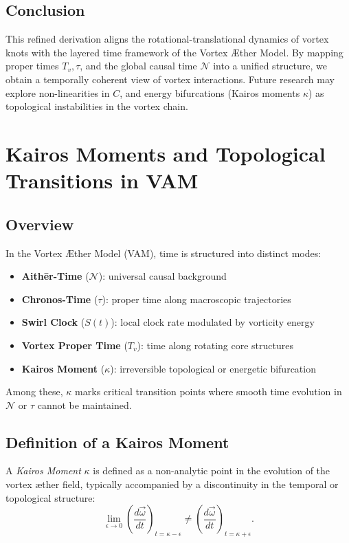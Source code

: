 \documentclass[a4paper,12pt]{article}
\begin{document}
    \subsection*{Conclusion}

    This refined derivation aligns the rotational-translational dynamics of vortex knots with the layered time framework of the Vortex Æther Model. By mapping proper times \( T_v, \tau \), and the global causal time \( \mathcal{N} \) into a unified structure, we obtain a temporally coherent view of vortex interactions. Future research may explore non-linearities in \( C \), and energy bifurcations (Kairos moments \( \kappa \)) as topological instabilities in the vortex chain.


        \section{Kairos Moments and Topological Transitions in VAM}

    \subsection*{Overview}
    In the Vortex \AE{}ther Model (VAM), time is structured into distinct modes:
    \begin{itemize}
        \item \textbf{Aith\={e}r-Time} (\( \mathcal{N} \)): universal causal background
        \item \textbf{Chronos-Time} (\( \tau \)): proper time along macroscopic trajectories
        \item \textbf{Swirl Clock} (\( S(t) \)): local clock rate modulated by vorticity energy
        \item \textbf{Vortex Proper Time} (\( T_v \)): time along rotating core structures
        \item \textbf{Kairos Moment} (\( \kappa \)): irreversible topological or energetic bifurcation
    \end{itemize}
    Among these, \( \kappa \) marks critical transition points where smooth time evolution in \( \mathcal{N} \) or \( \tau \) cannot be maintained.

    \subsection{Definition of a Kairos Moment}
    A \textit{Kairos Moment} \( \kappa \) is defined as a non-analytic point in the evolution of the vortex æther field, typically accompanied by a discontinuity in the temporal or topological structure:
    \begin{equation}
        \lim_{\epsilon \to 0} \left( \frac{d\vec{\omega}}{dt} \right)_{t = \kappa - \epsilon}
        \neq
        \left( \frac{d\vec{\omega}}{dt} \right)_{t = \kappa + \epsilon}.
    \end{equation}
\end{document}

